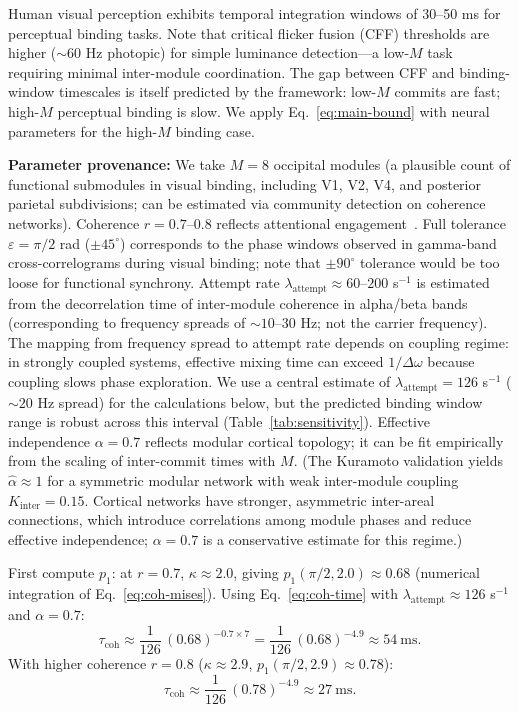 \documentclass[12pt]{article}
\begin{document}
Human visual perception exhibits temporal integration windows of 30--50 ms for perceptual binding tasks. Note that critical flicker fusion (CFF) thresholds are higher ($\sim$60 Hz photopic) for simple luminance detection---a low-$M$ task requiring minimal inter-module coordination. The gap between CFF and binding-window timescales is itself predicted by the framework: low-$M$ commits are fast; high-$M$ perceptual binding is slow. We apply Eq.~\ref{eq:main-bound} with neural parameters for the high-$M$ binding case.

\textbf{Parameter provenance:} We take $M=8$ occipital modules (a plausible count of functional submodules in visual binding, including V1, V2, V4, and posterior parietal subdivisions; can be estimated via community detection on coherence networks). Coherence $r=0.7$--$0.8$ reflects attentional engagement~\cite{fries2015}. Full tolerance $\varepsilon=\pi/2$ rad ($\pm 45^\circ$) corresponds to the phase windows observed in gamma-band cross-correlograms during visual binding; note that $\pm 90^\circ$ tolerance would be too loose for functional synchrony. Attempt rate $\lambda_{\mathrm{attempt}} \approx 60$--$200$ s$^{-1}$ is estimated from the decorrelation time of inter-module coherence in alpha/beta bands (corresponding to frequency spreads of $\sim 10$--$30$ Hz; not the carrier frequency). The mapping from frequency spread to attempt rate depends on coupling regime: in strongly coupled systems, effective mixing time can exceed $1/\Delta\omega$ because coupling slows phase exploration. We use a central estimate of $\lambda_{\mathrm{attempt}} = 126$ s$^{-1}$ ($\sim 20$ Hz spread) for the calculations below, but the predicted binding window range is robust across this interval (Table~\ref{tab:sensitivity}). Effective independence $\alpha=0.7$ reflects modular cortical topology; it can be fit empirically from the scaling of inter-commit times with $M$. (The Kuramoto validation yields $\hat{\alpha} \approx 1$ for a symmetric modular network with weak inter-module coupling $K_{\mathrm{inter}} = 0.15$. Cortical networks have stronger, asymmetric inter-areal connections, which introduce correlations among module phases and reduce effective independence; $\alpha = 0.7$ is a conservative estimate for this regime.)

First compute $p_1$: at $r=0.7$, $\kappa \approx 2.0$, giving $p_1(\pi/2, 2.0) \approx 0.68$ (numerical integration of Eq.~\ref{eq:coh-mises}). Using Eq.~\ref{eq:coh-time} with $\lambda_{\mathrm{attempt}} \approx 126$ s$^{-1}$ and $\alpha=0.7$:
\[
\tau_{\mathrm{coh}} \approx \frac{1}{126}\,(0.68)^{-0.7 \times 7}
= \frac{1}{126}\,(0.68)^{-4.9} \approx 54~\mathrm{ms}.
\]
With higher coherence $r=0.8$ ($\kappa \approx 2.9$, $p_1(\pi/2, 2.9) \approx 0.78$):
\[
\tau_{\mathrm{coh}} \approx \frac{1}{126}\,(0.78)^{-4.9} \approx 27~\mathrm{ms}.
\]
\end{document}
